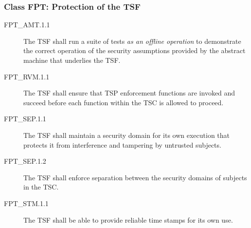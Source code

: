 \documentclass[12pt,english]{scrbook}
\begin{document}
\subsubsection{Class FPT: Protection of the TSF}





\begin{description}

\item[FPT{\_}AMT.1.1 ]


The TSF shall run a suite of tests \emph{as an offline
operation} to demonstrate the correct operation of the security
assumptions provided by the abstract machine that underlies the
TSF.



\end{description}


\begin{description}

\item[FPT{\_}RVM.1.1 ]


The TSF shall ensure that TSP enforcement functions are invoked
and succeed before each function within the TSC is allowed to
proceed.



\end{description}


\begin{description}

\item[FPT{\_}SEP.1.1 ]

The TSF shall maintain a security domain for its own execution that protects it
from interference and tampering by untrusted subjects.

\item[FPT{\_}SEP.1.2 ]

The TSF shall enforce separation between the security domains of subjects in
the TSC.

\end{description}





\begin{description}

\item[FPT{\_}STM.1.1]


The TSF shall be able to provide reliable time stamps for its own use.



\end{description}
\end{document}
